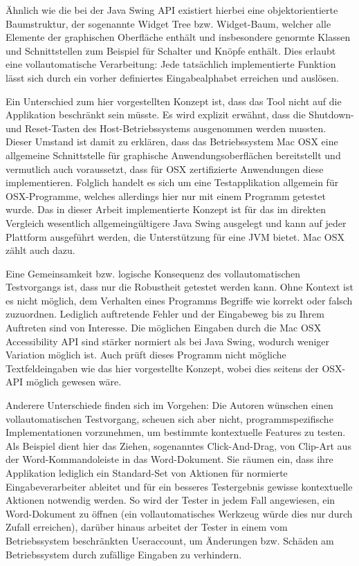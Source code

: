 Ähnlich wie die bei der Java Swing API existiert hierbei eine objektorientierte Baumstruktur,
der sogenannte \glqq{}Widget Tree\grqq{} bzw. Widget-Baum, welcher alle Elemente der graphischen Oberfläche enthält
und insbesondere genormte Klassen und Schnittstellen zum Beispiel für Schalter
und Knöpfe enthält. Dies erlaubt eine vollautomatische Verarbeitung:
Jede tatsächlich implementierte Funktion lässt sich durch ein vorher definiertes
\glqq{}Eingabealphabet\grqq{} erreichen und auslösen.

Ein Unterschied zum
hier vorgestellten Konzept ist, dass das Tool nicht auf die Applikation beschränkt sein müsste. Es wird
explizit erwähnt, dass die Shutdown- und Reset-Tasten des Host-Betriebssystems ausgenommen werden
mussten. Dieser Umstand ist damit zu erklären, dass das Betriebssystem Mac OSX eine allgemeine
Schnittstelle für graphische Anwendungsoberflächen bereitstellt und vermutlich auch voraussetzt,
dass für OSX zertifizierte Anwendungen diese implementieren. Folglich handelt es sich um eine
Testapplikation allgemein für OSX-Programme, welches allerdings hier nur mit einem Programm
getestet wurde. Das in dieser Arbeit implementierte Konzept ist für das im direkten Vergleich 
wesentlich allgemeingültigere Java Swing ausgelegt und kann auf jeder Plattform ausgeführt werden, 
die Unterstützung für eine JVM bietet. Mac OSX zählt auch dazu.

Eine Gemeinsamkeit bzw. logische Konsequenz des vollautomatischen Testvorgangs ist, dass nur
die Robustheit getestet werden kann. Ohne Kontext ist es nicht möglich, dem Verhalten eines
Programms Begriffe wie \glqq{}korrekt\grqq{} oder \glqq{}falsch\grqq{} zuzuordnen. Lediglich auftretende
Fehler und der Eingabeweg bis zu Ihrem Auftreten sind von Interesse.
Die möglichen Eingaben durch die \glqq{}Mac OSX Accessibility API\grqq{} sind stärker normiert als bei
Java Swing, wodurch weniger Variation möglich ist. Auch prüft dieses Programm nicht mögliche
Textfeldeingaben wie das hier vorgestellte Konzept, wobei dies seitens der OSX-API möglich gewesen wäre.

Anderere Unterschiede finden sich im Vorgehen: Die Autoren wünschen einen vollautomatischen
Testvorgang, scheuen sich aber nicht, programmspezifische Implementationen vorzunehmen, um
bestimmte kontextuelle Features zu testen. Als Beispiel dient hier das Ziehen, sogenanntes
\glqq{}Click-And-Drag\grqq{}, von Clip-Art aus der Word-Kommandoleiste in das Word-Dokument.
Sie räumen ein, dass ihre Applikation lediglich ein Standard-Set von Aktionen für
normierte Eingabeverarbeiter ableitet und für ein besseres Testergebnis gewisse
kontextuelle Aktionen notwendig werden. So wird der Tester in jedem Fall angewiesen,
ein Word-Dokument zu öffnen (ein vollautomatisches Werkzeug würde dies nur durch Zufall erreichen),
darüber hinaus arbeitet der Tester in einem vom Betriebssystem beschränkten Useraccount,
um Änderungen bzw. Schäden am Betriebssystem durch zufällige Eingaben zu verhindern.

